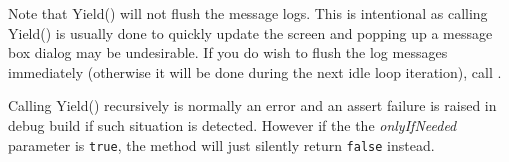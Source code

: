 Note that Yield() will not flush the message logs. This is intentional as
calling Yield() is usually done to quickly update the screen and popping up a
message box dialog may be undesirable. If you do wish to flush the log
messages immediately (otherwise it will be done during the next idle loop
iteration), call .

Calling Yield() recursively is normally an error and an assert failure is
raised in debug build if such situation is detected. However if the the 
{\it onlyIfNeeded} parameter is {\tt true}, the method will just silently
return {\tt false} instead.

